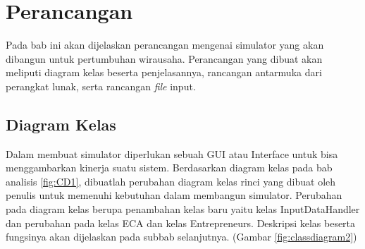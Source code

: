 \chapter{Perancangan}
\label{chap:perancangan}

Pada bab ini akan dijelaskan perancangan mengenai simulator yang akan dibangun untuk pertumbuhan wirausaha. Perancangan yang dibuat akan meliputi diagram kelas beserta penjelasannya, rancangan antarmuka dari perangkat lunak, serta rancangan \textit{file} input.


\section{Diagram Kelas}
\label{sec:perancangankelas}

Dalam membuat simulator diperlukan sebuah GUI atau Interface untuk bisa menggambarkan kinerja suatu sistem. Berdasarkan diagram kelas pada bab analisis \ref{fig:CD1}, dibuatlah perubahan diagram kelas rinci yang dibuat oleh penulis untuk memenuhi kebutuhan dalam membangun simulator. Perubahan pada diagram kelas berupa penambahan kelas baru yaitu kelas InputDataHandler dan perubahan pada kelas ECA dan kelas Entrepreneurs. Deskripsi kelas beserta fungsinya akan dijelaskan pada subbab selanjutnya. (Gambar \ref{fig:classdiagram2})

